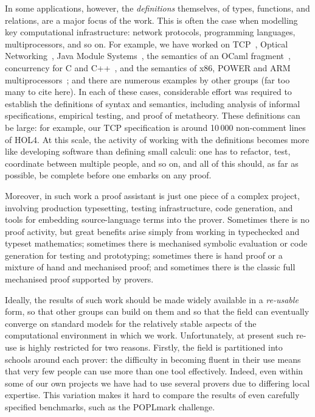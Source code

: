 \documentclass[a4paper]{llncs}
\begin{document}
In some applications, however, the \emph{definitions} themselves, of
types, functions, and relations, are a
major focus of the work.  This is often the case when modelling key
computational infrastructure: network protocols, programming languages,
multiprocessors, and so on.  For example, we have worked on
TCP~\cite{TCP:paper,RNS08}, Optical Networking~\cite{BDJRS06},
Java Module Systems~\cite{ljam}, the semantics of an OCaml
fragment~\cite{ocamllightesop}, concurrency for C and
C++~\cite{C++,ppdp11,Ctso}, and the semantics of x86, POWER and ARM
multiprocessors~\cite{pldi11,x86popl}; and there are numerous
examples by other groups (far too many to cite here).  In each of
these cases, considerable effort was required to establish the
definitions of syntax and semantics, including analysis of informal
specifications, empirical testing, and proof of metatheory.  
%
These definitions can be large: for example, our TCP specification is
around 10\,000 non-comment lines of HOL4.  At this scale, the activity
of working with the definitions becomes more like developing software than
defining small calculi: one has to refactor, test, coordinate between
multiple people, and so on, and all of this should, as far as
possible, be complete before one embarks on any proof.  


  Moreover, in such work a
proof assistant is just one piece of a complex project, involving
production typesetting, testing infrastructure, code generation, and
tools for embedding source-language terms into the prover.  Sometimes
there is no proof activity, but great benefits arise simply from working
in typechecked and typeset mathematics; sometimes there is mechanised
symbolic evaluation or code generation for testing and prototyping;
sometimes there is hand proof or a mixture of hand and mechanised proof;
and sometimes there is the classic full mechanised proof supported by
provers.

Ideally, the results of such work should be made widely available in a
\emph{re-usable} form, so that other groups can build on them and so
that the field can eventually converge on standard models for the
relatively stable aspects of the computational environment in which we
work.   
%
%
Unfortunately, at present such re-use is highly restricted for two
reasons.
Firstly, the field is partitioned into schools around each prover: the
difficulty in becoming fluent in their use means that very few people
can use more than one tool effectively.  Indeed, even within some of our
own projects we have had to use several provers due to differing local
expertise.  This variation makes it hard to compare the results of even
carefully specified benchmarks, such as the POPLmark
challenge.%
\end{document}
